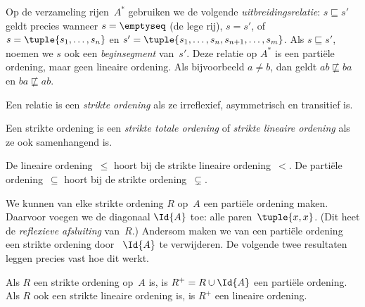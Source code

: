 \documentclass[openany]{memoir}
\begin{document}
\begin{ex}
Op de verzameling rijen~$A^*$ gebruiken we de volgende
\emph{uitbreidingsrelatie}: $s \sqsubseteq s'$ geldt precies wanneer
$s = \emptyseq$ (de lege rij), $s = s'$, of $s =
\tuple{s_1, \dots, s_n}$ en $s' =
\tuple{s_1, \dots, s_n, s_{n+1}, \dots, s_m}$. Als $s \sqsubseteq s'$,
noemen we $s$ ook een \emph{beginsegment} van~$s'$. Deze relatie op $A^*$ is
een partiële ordening, maar geen lineaire ordening. Als bijvoorbeeld $a \neq b$,
dan geldt $ab \not\sqsubseteq ba$ en $ba \not\sqsubseteq ab$.
\end{ex}

\begin{defn}
Een relatie is een \emph{strikte ordening} als ze irreflexief, asymmetrisch en
transitief is.
\end{defn}

\begin{defn}
Een strikte ordening is een \emph{strikte totale ordening} of \emph{strikte
lineaire ordening} als ze ook samenhangend is.
\end{defn}

\begin{ex}
De lineaire ordening~$\le$ hoort bij de strikte lineaire ordening~$<$. De
partiële ordening~$\subseteq$ hoort bij de strikte ordening~$\subsetneq$.
\end{ex}

We kunnen van elke strikte ordening $R$ op~$A$ een partiële ordening maken.
Daarvoor voegen we de diagonaal $\Id{A}$ toe: alle paren~$\tuple{x,
x}$.  (Dit heet de \emph{reflexieve afsluiting} van~$R$.)
Andersom maken we van een partiële ordening een strikte ordening door
~$\Id{A}$ te verwijderen. De volgende twee resultaten leggen precies vast hoe
dit werkt.

\begin{prop}
Als $R$ een strikte ordening op~$A$ is, is $R^+ = R \cup \Id{A}$ een partiële
ordening. Als $R$ ook een strikte lineaire ordening is, is $R^+$ een lineaire
ordening.
\end{prop}
\end{document}
